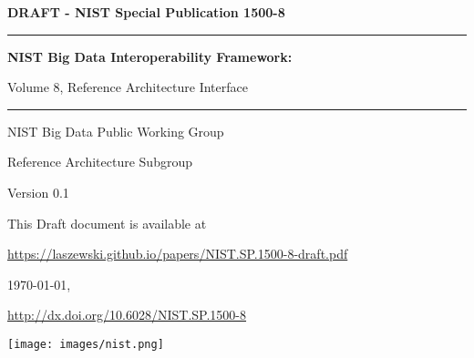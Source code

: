 %
%


\begin{flushright}
{\Large\bf DRAFT - NIST Special Publication 1500-8} 

\bigskip\bigskip

\hrule
\bigskip\bigskip

{\Huge\bf \sf
NIST Big Data Interoperability Framework:

\bigskip

Volume 8, Reference Architecture Interface
}


\bigskip\bigskip
\hrule

\vspace{2cm}

{\large

NIST Big Data Public Working Group

Reference Architecture Subgroup

\vspace{2cm}

Version 0.1

\bigskip

This Draft document is available at


\url{https://laszewski.github.io/papers/NIST.SP.1500-8-draft.pdf}

\bigskip

\today, \currenttime

\bigskip
\url{http://dx.doi.org/10.6028/NIST.SP.1500-8}

}
\vspace{2cm}

\vfill

\begin{flushright}
\texttt{[image: images/nist.png]}
\end{flushright}

\end{flushright}

\newpage

